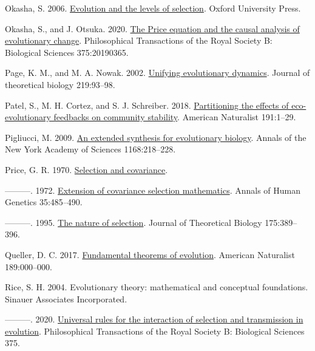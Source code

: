 \documentclass[
]{article}
\newlength{\cslhangindent}
\newlength{\cslentryspacingunit} %
\newenvironment{CSLReferences}[2] %
 {%
  \setlength{\parindent}{0pt}
  \ifodd #1
  \let\oldpar\par
  \def\par{\hangindent=\cslhangindent\oldpar}
  \fi
  \setlength{\parskip}{#2\cslentryspacingunit}
 }%
 {}
\begin{document}
\begin{CSLReferences}{0}{0}
\leavevmode{}%
Okasha, S. 2006.
\href{https://doi.org/10.1093/acprof:oso/9780199267972.001.0001}{Evolution
and the levels of selection}. Oxford University Press.

\leavevmode{}%
Okasha, S., and J. Otsuka. 2020.
\href{https://doi.org/10.1098/rstb.2019.0365}{{The Price equation and
the causal analysis of evolutionary change}}. Philosophical Transactions
of the Royal Society B: Biological Sciences 375:20190365.

\leavevmode{}%
Page, K. M., and M. A. Nowak. 2002.
\href{https://doi.org/10.1006/jtbi.2002.3112}{Unifying evolutionary
dynamics}. Journal of theoretical biology 219:93--98.

\leavevmode{}%
Patel, S., M. H. Cortez, and S. J. Schreiber. 2018.
\href{https://doi.org/10.1101/104505}{{Partitioning the effects of
eco-evolutionary feedbacks on community stability}}. American Naturalist
191:1--29.

\leavevmode{}%
Pigliucci, M. 2009.
\href{https://doi.org/10.1111/j.1749-6632.2009.04578.x}{{An extended
synthesis for evolutionary biology}}. Annals of the New York Academy of
Sciences 1168:218--228.

\leavevmode{}%
Price, G. R. 1970. \href{https://doi.org/10.1038/227520a0}{{Selection
and covariance}}.

\leavevmode{}%
---------. 1972.
\href{https://doi.org/10.1111/j.1469-1809.1957.tb01874.x}{{Extension of
covariance selection mathematics}}. Annals of Human Genetics
35:485--490.

\leavevmode{}%
---------. 1995. \href{https://doi.org/10.1006/jtbi.1995.0149}{{The
nature of selection}}. Journal of Theoretical Biology 175:389--396.

\leavevmode{}%
Queller, D. C. 2017. \href{https://doi.org/10.1086/690937}{{Fundamental
theorems of evolution}}. American Naturalist 189:000--000.

\leavevmode{}%
Rice, S. H. 2004. {Evolutionary theory: mathematical and conceptual
foundations}. Sinauer Associates Incorporated.

\leavevmode{}%
---------. 2020.
\href{https://doi.org/10.1098/rstb.2019.0353}{{Universal rules for the
interaction of selection and transmission in evolution}}. Philosophical
Transactions of the Royal Society B: Biological Sciences 375.


\end{CSLReferences}
\end{document}
